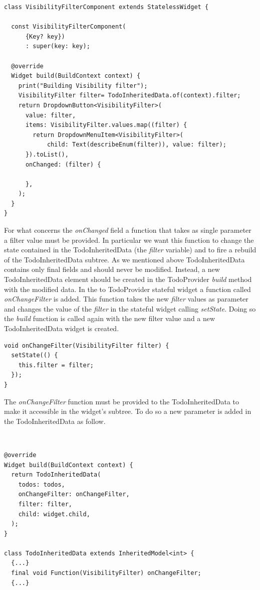 \begin{verbatim}
class VisibilityFilterComponent extends StatelessWidget {

  const VisibilityFilterComponent(
      {Key? key})
      : super(key: key);

  @override
  Widget build(BuildContext context) {
    print("Building Visibility filter");
    VisibilityFilter filter= TodoInheritedData.of(context).filter;
    return DropdownButton<VisibilityFilter>(
      value: filter,
      items: VisibilityFilter.values.map((filter) {
        return DropdownMenuItem<VisibilityFilter>(
            child: Text(describeEnum(filter)), value: filter);
      }).toList(),
      onChanged: (filter) {
        
      },
    );
  }
}
\end{verbatim}

For what concerns the \textit{onChanged  }field a function that takes as single parameter a filter value must be provided. In particular we want this function to change the state contained in the TodoInheritedData (the \textit{filter} variable) and to fire a rebuild of the TodoInheritedData subtree. As we mentioned above TodoInheritedData contains only final fields and should never be modified. Instead, a new TodoInheritedData element should be created in the TodoProvider \textit{build} method with the modified data.
In the to TodoProvider stateful widget a function called \textit{onChangeFilter   }is added. This function takes the new \textit{filter} values as parameter and changes the value of the \textit{filter} in the stateful widget calling \textit{setState}. Doing so the \textit{build} function is called again with the new filter value and a new TodoInheritedData widget is created.
\mbox{}\\


\begin{verbatim}
void onChangeFilter(VisibilityFilter filter) {
  setState(() {
    this.filter = filter;
  });
}
\end{verbatim}

The \textit{onChangeFilter   }function must be provided to the TodoInheritedData to make it accessible in the widget’s subtree. To do so a new parameter is added in the TodoInheritedData  as follow.


\mbox{}\\


\begin{verbatim}
@override
Widget build(BuildContext context) {
  return TodoInheritedData(
    todos: todos,
    onChangeFilter: onChangeFilter,
    filter: filter,
    child: widget.child,
  );
}

class TodoInheritedData extends InheritedModel<int> {
  {...}
  final void Function(VisibilityFilter) onChangeFilter;
  {...}
 \end{verbatim}
 

